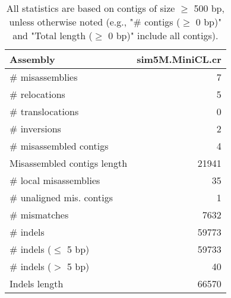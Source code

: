 \documentclass[12pt,a4paper]{article}
\begin{document}
\begin{table}[ht]
\begin{center}
\caption{All statistics are based on contigs of size $\geq$ 500 bp, unless otherwise noted (e.g., "\# contigs ($\geq$ 0 bp)" and "Total length ($\geq$ 0 bp)" include all contigs).}
\begin{tabular}{|l*{1}{|r}|}
\hline
Assembly & sim5M.MiniCL.cr \\ \hline
\# misassemblies & 7 \\ \hline
\hspace{5mm}\# relocations & 5 \\ \hline
\hspace{5mm}\# translocations & 0 \\ \hline
\hspace{5mm}\# inversions & 2 \\ \hline
\# misassembled contigs & 4 \\ \hline
Misassembled contigs length & 21941 \\ \hline
\# local misassemblies & 35 \\ \hline
\# unaligned mis. contigs & 1 \\ \hline
\# mismatches & 7632 \\ \hline
\# indels & 59773 \\ \hline
\hspace{5mm}\# indels ($\leq$ 5 bp) & 59733 \\ \hline
\hspace{5mm}\# indels ($>$ 5 bp) & 40 \\ \hline
Indels length & 66570 \\ \hline
\end{tabular}
\end{center}
\end{table}
\end{document}
